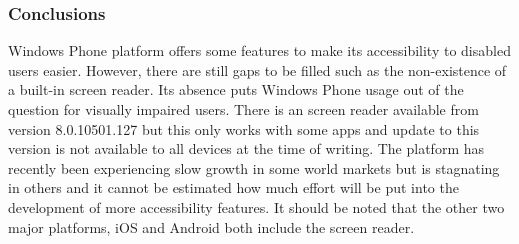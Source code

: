 \subsubsection{Conclusions}
Windows Phone platform offers some features to make its accessibility to disabled users easier. However, there are still gaps to be filled such as the non-existence of a built-in screen reader. Its absence puts Windows Phone usage out of the question for visually impaired users. There is an screen reader available from version 8.0.10501.127 but this only works with some apps and update to this version is not available to all devices at the time of writing. The platform has recently been experiencing slow growth in some world markets but is stagnating in others \cite{phone8market}  and it cannot be estimated how much effort will be put into the development of more accessibility features. It should be noted that the other two major platforms, iOS and Android both include the screen reader.
\endinput
